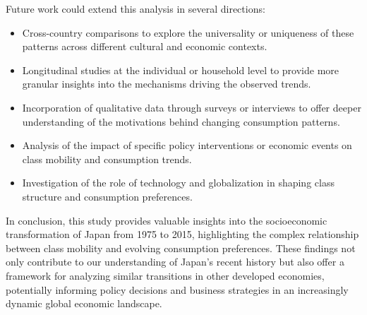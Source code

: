 \documentclass{article} %
\begin{document}
Future work could extend this analysis in several directions:
\begin{itemize}
    \item Cross-country comparisons to explore the universality or uniqueness of these patterns across different cultural and economic contexts.
    \item Longitudinal studies at the individual or household level to provide more granular insights into the mechanisms driving the observed trends.
    \item Incorporation of qualitative data through surveys or interviews to offer deeper understanding of the motivations behind changing consumption patterns.
    \item Analysis of the impact of specific policy interventions or economic events on class mobility and consumption trends.
    \item Investigation of the role of technology and globalization in shaping class structure and consumption preferences.
\end{itemize}

In conclusion, this study provides valuable insights into the socioeconomic transformation of Japan from 1975 to 2015, highlighting the complex relationship between class mobility and evolving consumption preferences. These findings not only contribute to our understanding of Japan's recent history but also offer a framework for analyzing similar transitions in other developed economies, potentially informing policy decisions and business strategies in an increasingly dynamic global economic landscape.



\end{document}

